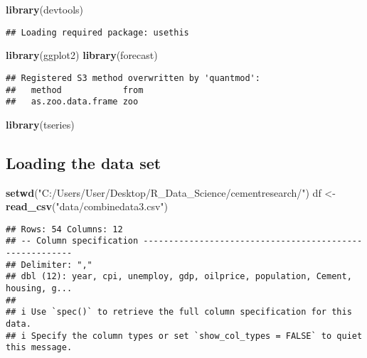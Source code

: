 \documentclass[
]{article}
\newenvironment{Shaded}{\begin{snugshade}}{\end{snugshade}}
\newcommand{\FunctionTok}[1]{\textcolor[rgb]{0.13,0.29,0.53}{\textbf{#1}}}
\newcommand{\NormalTok}[1]{#1}
\newcommand{\OtherTok}[1]{\textcolor[rgb]{0.56,0.35,0.01}{#1}}
\newcommand{\StringTok}[1]{\textcolor[rgb]{0.31,0.60,0.02}{#1}}
\begin{document}
\begin{Shaded}
\begin{Highlighting}[]
\FunctionTok{library}\NormalTok{(devtools)}
\end{Highlighting}
\end{Shaded}

\begin{verbatim}
## Loading required package: usethis
\end{verbatim}

\begin{Shaded}
\begin{Highlighting}[]
\FunctionTok{library}\NormalTok{(ggplot2)}
\FunctionTok{library}\NormalTok{(forecast)}
\end{Highlighting}
\end{Shaded}

\begin{verbatim}
## Registered S3 method overwritten by 'quantmod':
##   method            from
##   as.zoo.data.frame zoo
\end{verbatim}

\begin{Shaded}
\begin{Highlighting}[]
\FunctionTok{library}\NormalTok{(tseries)}
\end{Highlighting}
\end{Shaded}

\hypertarget{loading-the-data-set}{%
\subsection{Loading the data set}\label{loading-the-data-set}}

\begin{Shaded}
\begin{Highlighting}[]
\FunctionTok{setwd}\NormalTok{(}\StringTok{"C:/Users/User/Desktop/R\_Data\_Science/cementresearch/"}\NormalTok{)}
\NormalTok{df }\OtherTok{\textless{}{-}} \FunctionTok{read\_csv}\NormalTok{(}\StringTok{"data/combinedata3.csv"}\NormalTok{)}
\end{Highlighting}
\end{Shaded}

\begin{verbatim}
## Rows: 54 Columns: 12
## -- Column specification --------------------------------------------------------
## Delimiter: ","
## dbl (12): year, cpi, unemploy, gdp, oilprice, population, Cement, housing, g...
## 
## i Use `spec()` to retrieve the full column specification for this data.
## i Specify the column types or set `show_col_types = FALSE` to quiet this message.
\end{verbatim}
\end{document}
